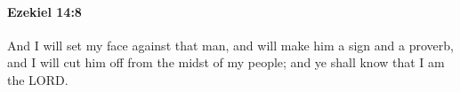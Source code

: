 
		\paragraph{Ezekiel 14:8} %
			\label{EZEKIEL-14-8}

			And I will set my face against that man, and will make him a sign and a proverb, and I will cut him off from the midst of my people; and ye shall know that I am the LORD.


